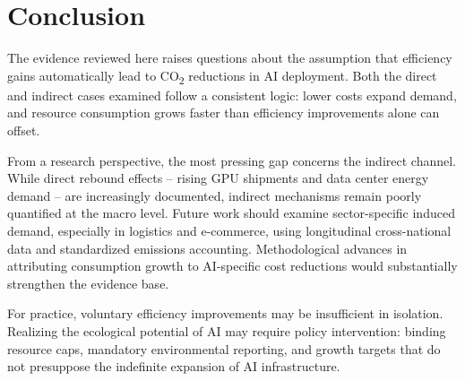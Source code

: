 \section{Conclusion}
\label{sec:conclusion}

The evidence reviewed here raises questions about the
assumption that efficiency gains automatically lead to
CO\textsubscript{2} reductions in AI deployment. Both the
direct and indirect cases examined follow a consistent logic:
lower costs expand demand, and resource consumption grows
faster than efficiency improvements alone can offset.

From a research perspective, the most pressing gap concerns the
indirect channel. While direct rebound effects -- rising GPU
shipments and data center energy demand -- are increasingly
documented, indirect mechanisms remain poorly quantified at the
macro level. Future work should examine sector-specific induced
demand, especially in logistics and e-commerce, using
longitudinal cross-national data and standardized emissions
accounting. Methodological advances in attributing consumption
growth to AI-specific cost reductions would substantially
strengthen the evidence base.

For practice, voluntary efficiency improvements may be
insufficient in isolation. Realizing the ecological potential
of AI may require policy intervention: binding resource caps,
mandatory environmental reporting, and growth targets that do
not presuppose the indefinite expansion of AI infrastructure.
